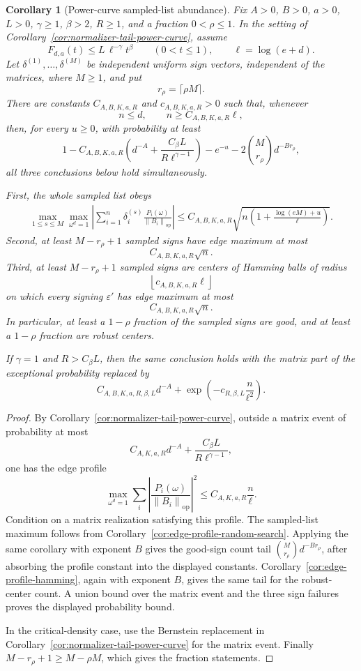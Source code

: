 \documentclass[11pt]{amsart}
\numberwithin{equation}{section}
\newtheorem{corollary}[theorem]{Corollary}
\theoremstyle{definition}
\theoremstyle{remark}
\newcommand{\op}{\mathrm{op}}
\newcommand{\norm}[1]{\left\lVert #1\right\rVert}
\newcommand{\eps}{\varepsilon}
\begin{document}
\begin{corollary}[Power-curve sampled-list abundance]
\label{cor:normalizer-tail-power-abundance}
Fix \(A>0\), \(B>0\), \(a>0\), \(L>0\), \(\gamma\ge1\), \(\beta>2\),
\(R\ge1\), and a fraction \(0<\rho\le1\).  In the setting of
Corollary~\ref{cor:normalizer-tail-power-curve}, assume
\[
  F_{d,a}(t)\le L\,\ell^{-\gamma}t^\beta
  \qquad(0<t\le1),
  \qquad \ell=\log(e+d).
\]
Let \(\delta^{(1)},\ldots,\delta^{(M)}\) be independent uniform sign vectors,
independent of the matrices, where \(M\ge1\), and put
\[
  r_\rho=\lceil\rho M\rceil .
\]
There are constants \(C_{A,B,K,a,R}\) and \(c_{A,B,K,a,R}>0\) such that,
whenever
\[
  n\le d,\qquad n\ge C_{A,B,K,a,R}\ell ,
\]
then, for every \(u\ge0\), with probability at least
\[
  1-C_{A,B,K,a,R}\left(d^{-A}+\frac{C_\beta L}{R\ell^{\gamma-1}}\right)
  -e^{-u}-2\binom{M}{r_\rho}d^{-B r_\rho},
\]
all three conclusions below hold simultaneously.

First, the whole sampled list obeys
\[
\begin{aligned}
  \max_{1\le s\le M}\max_{\omega^d=1}
  \left|\sum_{i=1}^n\delta_i^{(s)}
  \frac{P_i(\omega)}{\norm{B_i}_{\op}}\right|
  \le
  C_{A,B,K,a,R}\sqrt{
    n\left(1+\frac{\log(eM)+u}{\ell}\right)} .
\end{aligned}
\]
Second, at least \(M-r_\rho+1\) sampled signs have edge maximum at most
\[
  C_{A,B,K,a,R}\sqrt n .
\]
Third, at least \(M-r_\rho+1\) sampled signs are centers of Hamming balls of
radius
\[
  \left\lfloor c_{A,B,K,a,R}\ell\right\rfloor
\]
on which every signing \(\eps'\) has edge maximum at most
\[
  C_{A,B,K,a,R}\sqrt n .
\]
In particular, at least a \(1-\rho\) fraction of the sampled signs are good,
and at least a \(1-\rho\) fraction are robust centers.

If \(\gamma=1\) and \(R>C_\beta L\), then the same conclusion holds with the
matrix part of the exceptional probability replaced by
\[
  C_{A,B,K,a,R,\beta,L}d^{-A}
  +\exp\left(-c_{R,\beta,L}\frac n{\ell^2}\right).
\]
\end{corollary}

\begin{proof}
By Corollary~\ref{cor:normalizer-tail-power-curve}, outside a matrix event of
probability at most
\[
  C_{A,K,a,R}d^{-A}+\frac{C_\beta L}{R\ell^{\gamma-1}},
\]
one has the edge profile
\[
  \max_{\omega^d=1}\sum_i
  \left|\frac{P_i(\omega)}{\norm{B_i}_{\op}}\right|^2
  \le C_{A,K,a,R}\frac n\ell .
\]
Condition on a matrix realization satisfying this profile.  The sampled-list
maximum follows from Corollary~\ref{cor:edge-profile-random-search}.  Applying
the same corollary with exponent \(B\) gives the good-sign count tail
\(\binom{M}{r_\rho}d^{-B r_\rho}\), after absorbing the profile constant into
the displayed constants.  Corollary~\ref{cor:edge-profile-hamming}, again with
exponent \(B\), gives the same tail for the robust-center count.  A union bound
over the matrix event and the three sign failures proves the displayed
probability bound.

In the critical-density case, use the Bernstein replacement in
Corollary~\ref{cor:normalizer-tail-power-curve} for the matrix event.  Finally
\(M-r_\rho+1\ge M-\rho M\), which gives the fraction statements.
\end{proof}
\end{document}
